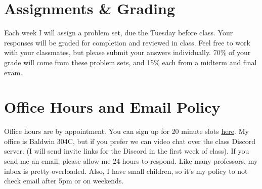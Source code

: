 \documentclass[11pt, letterpaper]{article}
\begin{document}
%
%
%
%

\section*{Assignments \& Grading}

Each week I will assign a problem set, due the Tuesday before class. Your responses will be graded for completion and reviewed in class. Feel free to work with your classmates, but please submit your answers individually. 70\% of your grade will come from these problem sets, and 15\% each from a midterm and final exam.

\section*{Office Hours and Email Policy}
Office hours are by appointment. You can sign up for 20 minute slots \href{https://calendly.com/joeornstein/20min}{here}. My office is Baldwin 304C, but if you prefer we can video chat over the class Discord server. (I will send invite links for the Discord in the first week of class). If you send me an email, please allow me 24 hours to respond. Like many professors, my inbox is pretty overloaded. Also, I have small children, so it's my policy to not check email after 5pm or on weekends. 
\end{document}
